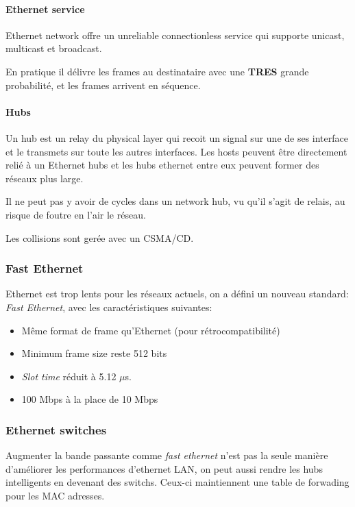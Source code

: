 \paragraph{Ethernet service}
Ethernet network offre un unreliable connectionless service qui supporte unicast, multicast et
broadcast.

En pratique il délivre les frames au destinataire avec une \textbf{TRES} grande probabilité,
et les frames arrivent en séquence.

\paragraph{Hubs} Un hub est un relay du physical layer qui recoit un signal sur une de ses interface et le transmets sur toute les autres interfaces. Les hosts peuvent être directement relié à un Ethernet hubs et les hubs ethernet entre eux peuvent former des réseaux plus large.

Il ne peut pas y avoir de cycles dans un network hub, vu qu'il s'agit de relais, au risque de foutre en l'air le réseau.

Les collisions sont gerée avec un CSMA/CD.

\subsubsection{Fast Ethernet}

Ethernet est trop lents pour les réseaux actuels, on a défini un nouveau standard: \textit{Fast Ethernet}, avec les caractéristiques suivantes:
\begin{itemize}
\item Même format de frame qu'Ethernet (pour rétrocompatibilité)
\item Minimum frame size reste 512 bits
\item \textit{Slot time} réduit à 5.12 $\mu$s.
\item 100 Mbps à la place de 10 Mbps
\end{itemize}

\subsubsection{Ethernet switches}

Augmenter la bande passante comme \textit{fast ethernet} n'est pas la seule manière d'améliorer les performances d'ethernet LAN, on peut aussi rendre les hubs intelligents en devenant des switchs. Ceux-ci maintiennent une table de forwading pour les MAC adresses.

